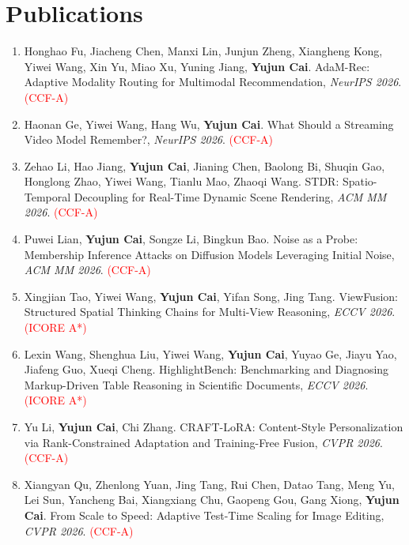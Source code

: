 \documentclass[11pt,letterpaper]{article}
\begin{document}
\section*{Publications}
\begin{enumerate}
\item Honghao Fu, Jiacheng Chen, Manxi Lin, Junjun Zheng, Xiangheng Kong, Yiwei Wang, Xin Yu, Miao Xu, Yuning Jiang, \textbf{Yujun Cai}. AdaM-Rec: Adaptive Modality Routing for Multimodal Recommendation, \textit{NeurIPS 2026}. \textcolor{red}{(CCF-A)}

\item Haonan Ge, Yiwei Wang, Hang Wu, \textbf{Yujun Cai}. What Should a Streaming Video Model Remember?, \textit{NeurIPS 2026}. \textcolor{red}{(CCF-A)}

\item Zehao Li, Hao Jiang, \textbf{Yujun Cai}, Jianing Chen, Baolong Bi, Shuqin Gao, Honglong Zhao, Yiwei Wang, Tianlu Mao, Zhaoqi Wang. STDR: Spatio-Temporal Decoupling for Real-Time Dynamic Scene Rendering, \textit{ACM MM 2026}. \textcolor{red}{(CCF-A)}

\item Puwei Lian, \textbf{Yujun Cai}, Songze Li, Bingkun Bao. Noise as a Probe: Membership Inference Attacks on Diffusion Models Leveraging Initial Noise, \textit{ACM MM 2026}. \textcolor{red}{(CCF-A)}

\item Xingjian Tao, Yiwei Wang, \textbf{Yujun Cai}, Yifan Song, Jing Tang. ViewFusion: Structured Spatial Thinking Chains for Multi-View Reasoning, \textit{ECCV 2026}. \textcolor{red}{(ICORE A*)}

\item Lexin Wang, Shenghua Liu, Yiwei Wang, \textbf{Yujun Cai}, Yuyao Ge, Jiayu Yao, Jiafeng Guo, Xueqi Cheng. HighlightBench: Benchmarking and Diagnosing Markup-Driven Table Reasoning in Scientific Documents, \textit{ECCV 2026}. \textcolor{red}{(ICORE A*)}

\item Yu Li, \textbf{Yujun Cai}, Chi Zhang. CRAFT-LoRA: Content-Style Personalization via Rank-Constrained Adaptation and Training-Free Fusion, \textit{CVPR 2026}. \textcolor{red}{(CCF-A)}

\item Xiangyan Qu, Zhenlong Yuan, Jing Tang, Rui Chen, Datao Tang, Meng Yu, Lei Sun, Yancheng Bai, Xiangxiang Chu, Gaopeng Gou, Gang Xiong, \textbf{Yujun Cai}. From Scale to Speed: Adaptive Test-Time Scaling for Image Editing, \textit{CVPR 2026}. \textcolor{red}{(CCF-A)}


\end{enumerate}
\end{document}
